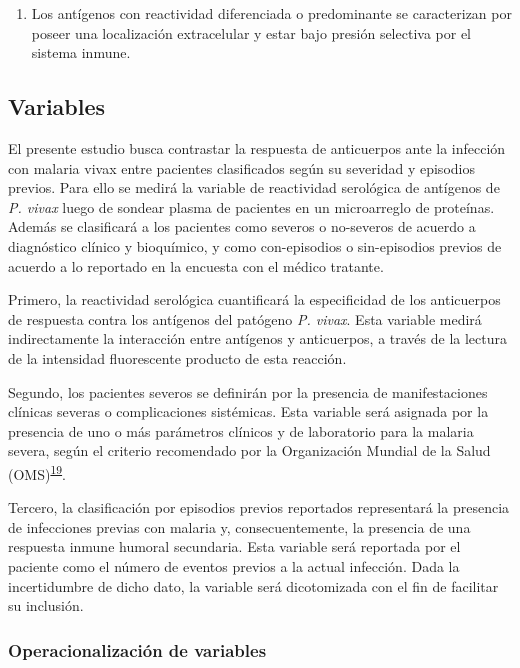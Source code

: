 \documentclass[]{article}
\providecommand{\tightlist}{%
  \setlength{\itemsep}{0pt}\setlength{\parskip}{0pt}}
\begin{document}
\begin{enumerate}
\def\labelenumi{\arabic{enumi}.}
\setcounter{enumi}{2}
\tightlist
\item
  Los antígenos con reactividad diferenciada o predominante se
  caracterizan por poseer una localización extracelular y estar bajo
  presión selectiva por el sistema inmune.
\end{enumerate}

\subsection{Variables}\label{variables}

El presente estudio busca contrastar la respuesta de anticuerpos ante la
infección con malaria vivax entre pacientes clasificados según su
severidad y episodios previos. Para ello se medirá la variable de
reactividad serológica de antígenos de \emph{P. vivax} luego de sondear
plasma de pacientes en un microarreglo de proteínas. Además se
clasificará a los pacientes como severos o no-severos de acuerdo a
diagnóstico clínico y bioquímico, y como con-episodios o sin-episodios
previos de acuerdo a lo reportado en la encuesta con el médico tratante.

Primero, la reactividad serológica cuantificará la especificidad de los
anticuerpos de respuesta contra los antígenos del patógeno \emph{P.
vivax}. Esta variable medirá indirectamente la interacción entre
antígenos y anticuerpos, a través de la lectura de la intensidad
fluorescente producto de esta reacción.

Segundo, los pacientes severos se definirán por la presencia de
manifestaciones clínicas severas o complicaciones sistémicas. Esta
variable será asignada por la presencia de uno o más parámetros clínicos
y de laboratorio para la malaria severa, según el criterio recomendado
por la Organización Mundial de la Salud
(OMS)\textsuperscript{\protect\hyperlink{ref-WHO2014severe}{19}}.

Tercero, la clasificación por episodios previos reportados representará
la presencia de infecciones previas con malaria y, consecuentemente, la
presencia de una respuesta inmune humoral secundaria. Esta variable será
reportada por el paciente como el número de eventos previos a la actual
infección. Dada la incertidumbre de dicho dato, la variable será
dicotomizada con el fin de facilitar su inclusión.

\subsubsection{Operacionalización de
variables}\label{operacionalizacion-de-variables}
\end{document}
